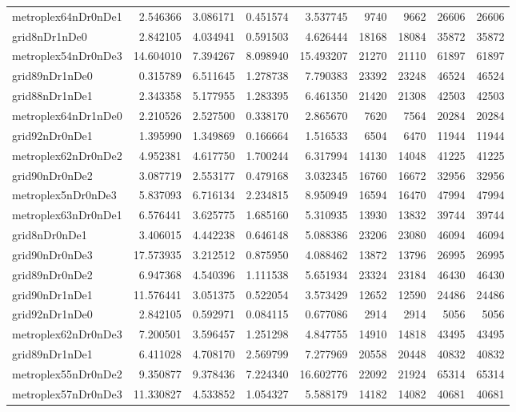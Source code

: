 \begin{longtable}{|l|r|r|r|r|r|r|r|r|}
metroplex64nDr0nDe1 & 2.546366 & 3.086171 & 0.451574 & 3.537745 & 9740 & 9662 & 26606 & 26606 \\
grid8nDr1nDe0 & 2.842105 & 4.034941 & 0.591503 & 4.626444 & 18168 & 18084 & 35872 & 35872 \\
metroplex54nDr0nDe3 & 14.604010 & 7.394267 & 8.098940 & 15.493207 & 21270 & 21110 & 61897 & 61897 \\
grid89nDr1nDe0 & 0.315789 & 6.511645 & 1.278738 & 7.790383 & 23392 & 23248 & 46524 & 46524 \\
grid88nDr1nDe1 & 2.343358 & 5.177955 & 1.283395 & 6.461350 & 21420 & 21308 & 42503 & 42503 \\
metroplex64nDr1nDe0 & 2.210526 & 2.527500 & 0.338170 & 2.865670 & 7620 & 7564 & 20284 & 20284 \\
grid92nDr0nDe1 & 1.395990 & 1.349869 & 0.166664 & 1.516533 & 6504 & 6470 & 11944 & 11944 \\
metroplex62nDr0nDe2 & 4.952381 & 4.617750 & 1.700244 & 6.317994 & 14130 & 14048 & 41225 & 41225 \\
grid90nDr0nDe2 & 3.087719 & 2.553177 & 0.479168 & 3.032345 & 16760 & 16672 & 32956 & 32956 \\
metroplex5nDr0nDe3 & 5.837093 & 6.716134 & 2.234815 & 8.950949 & 16594 & 16470 & 47994 & 47994 \\
metroplex63nDr0nDe1 & 6.576441 & 3.625775 & 1.685160 & 5.310935 & 13930 & 13832 & 39744 & 39744 \\
grid8nDr0nDe1 & 3.406015 & 4.442238 & 0.646148 & 5.088386 & 23206 & 23080 & 46094 & 46094 \\
grid90nDr0nDe3 & 17.573935 & 3.212512 & 0.875950 & 4.088462 & 13872 & 13796 & 26995 & 26995 \\
grid89nDr0nDe2 & 6.947368 & 4.540396 & 1.111538 & 5.651934 & 23324 & 23184 & 46430 & 46430 \\
grid90nDr1nDe1 & 11.576441 & 3.051375 & 0.522054 & 3.573429 & 12652 & 12590 & 24486 & 24486 \\
grid92nDr1nDe0 & 2.842105 & 0.592971 & 0.084115 & 0.677086 & 2914 & 2914 & 5056 & 5056 \\
metroplex62nDr0nDe3 & 7.200501 & 3.596457 & 1.251298 & 4.847755 & 14910 & 14818 & 43495 & 43495 \\
grid89nDr1nDe1 & 6.411028 & 4.708170 & 2.569799 & 7.277969 & 20558 & 20448 & 40832 & 40832 \\
metroplex55nDr0nDe2 & 9.350877 & 9.378436 & 7.224340 & 16.602776 & 22092 & 21924 & 65314 & 65314 \\
metroplex57nDr0nDe3 & 11.330827 & 4.533852 & 1.054327 & 5.588179 & 14182 & 14082 & 40681 & 40681 \\

\end{longtable}
